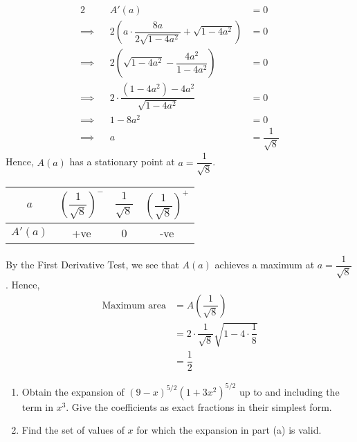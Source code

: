 \documentclass{echw}
\begin{document}
        \begin{alignat*}{2}
            &&A'(a) &= 0\\
            \implies&&2\left(a \cdot \dfrac{8a}{2\sqrt{1-4a^2}} + \sqrt{1 - 4a^2}\right) &= 0\\
            \implies&&2\left(\sqrt{1 - 4a^2} - \dfrac{4a^2}{1-4a^2}\right) &= 0\\
            \implies&&2 \cdot \dfrac{\left(1-4a^2\right) - 4a^2}{\sqrt{1-4a^2}} &= 0\\
            \implies&&1 - 8a^2 &= 0\\
            \implies&&a &= \dfrac1{\sqrt8}
        \end{alignat*}
        Hence, $A(a)$ has a stationary point at $a = \dfrac1{\sqrt8}$.
        \begin{table}[H]
            \centering
            \begin{tabular}{|c|c|c|c|}
            \hline
            $a$ & $\left(\dfrac1{\sqrt8}\right)^-$ & $\dfrac1{\sqrt8}$ & $\left(\dfrac1{\sqrt8}\right)^+$ \\\hline
            $A'(a)$ & +ve   & 0 & -ve   \\\hline
            \end{tabular}
        \end{table}
         By the First Derivative Test, we see that $A(a)$ achieves a maximum at $a = \dfrac1{\sqrt8}$. Hence,
        \begin{align*}
            \text{Maximum area} &= A\left(\dfrac1{\sqrt8}\right)\\
            &= 2\cdot\dfrac1{\sqrt8}\sqrt{1 - 4\cdot\dfrac18}\\
            &= \dfrac12 
        \end{align*}


    \problem{}
        \begin{enumerate}
            \item Obtain the expansion of $(9 - x)^{5/2}\left(1 + 3x^2\right)^{5/2}$ up to and including the term in $x^3$. Give the coefficients as exact fractions in their simplest form.
            \item Find the set of values of $x$ for which the expansion in part (a) is valid.
        \end{enumerate}

    \solution
\end{document}
